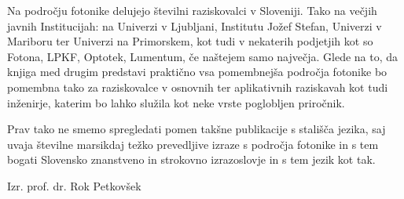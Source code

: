 \documentclass[11pt,fleqn]{book} %
\begin{document}
Na področju fotonike delujejo številni raziskovalci v Sloveniji. Tako na večjih javnih Institucijah: na Univerzi v Ljubljani, Institutu Jožef Stefan, Univerzi v Mariboru ter Univerzi na Primorskem, kot tudi v nekaterih podjetjih kot so Fotona, LPKF, Optotek, Lumentum, če naštejem samo največja. Glede na to, da knjiga med drugim predstavi praktično vsa pomembnejša področja fotonike bo pomembna tako za raziskovalce v osnovnih ter aplikativnih raziskavah kot tudi inženirje, katerim bo lahko služila kot neke vrste poglobljen priročnik.

Prav tako ne smemo spregledati pomen takšne publikacije s stališča jezika, saj uvaja številne marsikdaj težko prevedljive izraze s področja fotonike in s tem bogati Slovensko znanstveno in strokovno izrazoslovje in s tem jezik kot tak.

Izr. prof. dr. Rok Petkovšek 

\printindex
\end{document}
